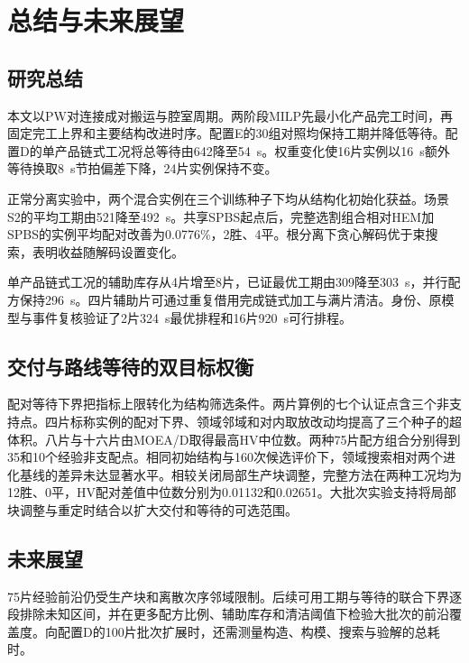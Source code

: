 \chapter{总结与未来展望}
\section{研究总结}
本文以PW对连接成对搬运与腔室周期。两阶段MILP先最小化产品完工时间，再固定完工上界和主要结构改进时序。配置E的30组对照均保持工期并降低等待。配置D的单产品链式工况将总等待由642降至54~s。权重变化使16片实例以16~s额外等待换取8~s节拍偏差下降，24片实例保持不变。

正常分离实验中，两个混合实例在三个训练种子下均从结构化初始化获益。场景S2的平均工期由521降至492~s。共享SPBS起点后，完整选割组合相对HEM加SPBS的实例平均配对改善为0.0776\%，2胜、4平。根分离下贪心解码优于束搜索，表明收益随解码设置变化。

单产品链式工况的辅助库存从4片增至8片，已证最优工期由309降至303~s，并行配方保持296~s。四片辅助片可通过重复借用完成链式加工与满片清洁。身份、原模型与事件复核验证了2片324~s最优排程和16片920~s可行排程。

\section{交付与路线等待的双目标权衡}
配对等待下界把指标上限转化为结构筛选条件。两片算例的七个认证点含三个非支持点。四片标称实例的配对下界、领域邻域和对内取放改动均提高了三个种子的超体积。八片与十六片由MOEA/D取得最高HV中位数。两种75片配方组合分别得到35和10个经验非支配点。相同初始结构与160次候选评价下，领域搜索相对两个进化基线的差异未达显著水平。相较关闭局部生产块调整，完整方法在两种工况均为12胜、0平，HV配对差值中位数分别为0.01132和0.02651。大批次实验支持将局部块调整与重定时结合以扩大交付和等待的可选范围。

\section{未来展望}
75片经验前沿仍受生产块和离散次序邻域限制。后续可用工期与等待的联合下界逐段排除未知区间，并在更多配方比例、辅助库存和清洁阈值下检验大批次的前沿覆盖度。向配置D的100片批次扩展时，还需测量构造、构模、搜索与验解的总耗时。
